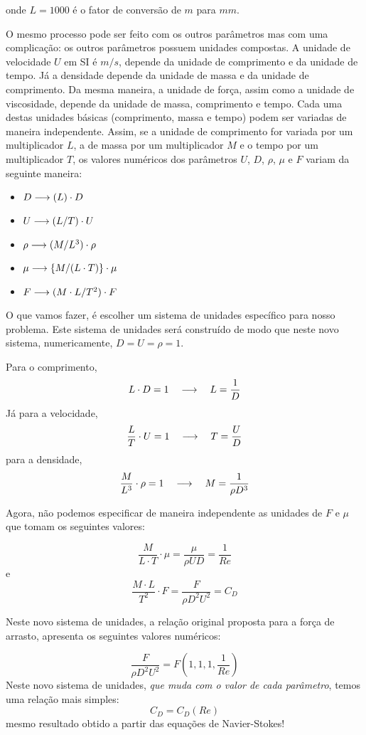 onde $L = 1000$ é o fator de conversão de $m$ para $mm$.

O mesmo processo pode ser feito com os outros parâmetros mas com uma complicação: os outros parâmetros possuem unidades compostas. A unidade de velocidade $U$ em SI é $m/s$, depende da unidade de comprimento e da unidade de tempo. Já a densidade depende da unidade de massa e da unidade de comprimento. Da mesma maneira, a unidade de força, assim como a unidade de viscosidade,  depende da unidade de massa, comprimento e tempo. Cada uma destas unidades básicas (comprimento, massa e tempo) podem ser variadas de maneira independente. Assim, se a unidade de comprimento for variada por um multiplicador $L$, a de massa por um multiplicador $M$ e o tempo por um multiplicador $T$, os valores numéricos dos parâmetros $U$, $D$, $\rho$, $\mu$ e $F$ variam da seguinte maneira:

\begin{itemize}
\item $D \longrightarrow (L) \cdot D$
\item $U \longrightarrow (L/T) \cdot U$
\item $\rho \longrightarrow  (M/L^3) \cdot\rho$
\item $\mu \longrightarrow \{M/(L\cdot T)\}\cdot\mu$
\item $F \longrightarrow (M \cdot L / T^2) \cdot F$
\end{itemize}

O que vamos fazer, é escolher um sistema de unidades específico para nosso problema. Este sistema de unidades será construído de modo que neste novo sistema, numericamente, $D = U = \rho = 1$.

Para o comprimento,
\[
L \cdot D = 1 \quad\longrightarrow\quad L = \frac{1}{D}
\]
Já para a velocidade,
\[
\frac{L}{T} \cdot U = 1 \quad\longrightarrow\quad T = \frac{U}{D}
\]
para a densidade,
\[
\frac{M}{L^3} \cdot \rho = 1 \quad\longrightarrow\quad M = \frac{1}{\rho D^3}
\]

Agora, não podemos especificar de maneira independente as unidades de $F$ e $\mu$ que tomam os seguintes valores:

\[
\frac{M}{L\cdot T} \cdot \mu = \frac{\mu}{\rho U D} = \frac{1}{Re}
\]
e
\[
\frac{M\cdot L}{T^2} \cdot F = \frac{F}{\rho D^2 U^2} = C_D
\]

Neste novo sistema de unidades, a relação original proposta para a força de arrasto, apresenta os seguintes valores numéricos:

\[
\frac{F}{\rho D^2 U^2} = F\left(1,1,1, \frac{1}{Re} \right)
\]
Neste novo sistema de unidades, \emph{que muda com o valor de cada parâmetro}, temos uma relação mais simples:
\[
C_D = C_D(Re)
\]
mesmo resultado obtido a partir das equações de Navier-Stokes!

